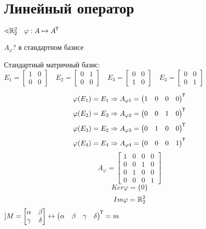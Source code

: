 

\cfoot{}

\usepackage{mathrsfs}



\section{Линейный оператор}

\begin{example}
    $\sphericalangle \mathbb{R}^2_2 \quad \varphi : A\mapsto A^{\mkern-1.5mu\mathsf{T}} $

    $A_\varphi?$ в стандартном базисе

    Стандартный матричный базис: $E_1=\begin{bmatrix}
            1 & 0 \\
            0 & 0
        \end{bmatrix} \quad E_2=\begin{bmatrix}
            0 & 1 \\
            0 & 0
        \end{bmatrix} \quad E_3 = \begin{bmatrix}
            0 & 0 \\
            1 & 0
        \end{bmatrix} \quad E_3 = \begin{bmatrix}
            0 & 0 \\
            0 & 1
        \end{bmatrix}$

    $$\varphi(E_1)=E_1 \Rightarrow A_{\varphi1}=\begin{pmatrix}
            1 & 0 & 0 & 0
        \end{pmatrix}^{\mkern-1.5mu\mathsf{T}} $$
    $$\varphi(E_2)=E_3 \Rightarrow A_{\varphi2}=\begin{pmatrix}
            0 & 0 & 1 & 0
        \end{pmatrix}^{\mkern-1.5mu\mathsf{T}} $$
    $$\varphi(E_3)=E_2 \Rightarrow A_{\varphi3}=\begin{pmatrix}
            0 & 1 & 0 & 0
        \end{pmatrix}^{\mkern-1.5mu\mathsf{T}} $$
    $$\varphi(E_4)=E_4 \Rightarrow A_{\varphi4}=\begin{pmatrix}
            0 & 0 & 0 & 1
        \end{pmatrix}^{\mkern-1.5mu\mathsf{T}} $$
    $$A_\varphi=\begin{bmatrix}
            1 & 0 & 0 & 0 \\
            0 & 0 & 1 & 0 \\
            0 & 1 & 0 & 0 \\
            0 & 0 & 0 & 1
        \end{bmatrix}$$
    $$Ker \varphi = \{0\}$$
    $$Im \varphi = \mathbb{R}_2^2$$
    $] M = \begin{bmatrix}
            \alpha & \beta  \\
            \gamma & \delta
        \end{bmatrix} \leftrightarrow \begin{pmatrix}
            \alpha & \beta & \gamma & \delta
        \end{pmatrix}^{\mkern-1.5mu\mathsf{T}} =m$


\end{example}
